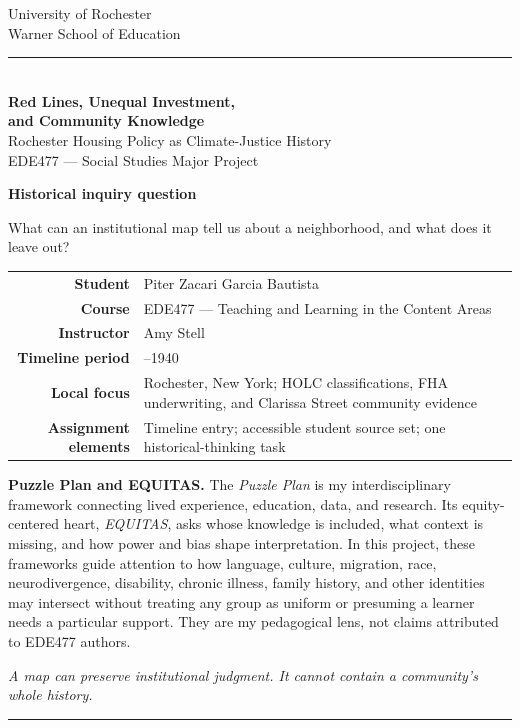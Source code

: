 \documentclass[11pt]{article}
\begin{document}
\hypersetup{pageanchor=false}
\begin{titlepage}
\thispagestyle{empty}
\begin{center}
{\large University of Rochester\\}
{\normalsize Warner School of Education\\[0.12in]}
{\color{PrimaryRed}\rule{\textwidth}{1.5pt}}\\[0.18in]
{\Huge\bfseries Red Lines, Unequal Investment,\\[0.06in]and Community Knowledge}\\[0.18in]
{\LARGE Rochester Housing Policy as Climate-Justice History}\\[0.18in]
{\Large EDE477 --- Social Studies Major Project}\\[0.12in]
\vfill
\begin{focusbox}
\centering
\textbf{Historical inquiry question}\par
What can an institutional map tell us about a neighborhood, and what does it leave out?
\end{focusbox}
\vfill
\renewcommand{\arraystretch}{1.28}
\begin{tabular}{>{\bfseries}r >{\RaggedRight\arraybackslash}p{5.15in}}
Student & Piter Zacari Garcia Bautista \\
Course & EDE477 --- Teaching and Learning in the Content Areas \\
Instructor & Amy Stell \\
Timeline period & 1935--1940 \\
Local focus & Rochester, New York; HOLC classifications, FHA underwriting, and Clarissa Street community evidence \\
Assignment elements & Timeline entry; accessible student source set; one historical-thinking task \\
\end{tabular}
\vspace{0.18in}
\begin{minipage}{0.99\textwidth}
\small
\textbf{Puzzle Plan and EQUITAS.} The \textit{Puzzle Plan} is my interdisciplinary framework connecting lived experience, education, data, and research. Its equity-centered heart, \textit{EQUITAS}, asks whose knowledge is included, what context is missing, and how power and bias shape interpretation. In this project, these frameworks guide attention to how language, culture, migration, race, neurodivergence, disability, chronic illness, family history, and other identities may intersect without treating any group as uniform or presuming a learner needs a particular support. They are my pedagogical lens, not claims attributed to EDE477 authors.
\end{minipage}
\vfill
{\itshape A map can preserve institutional judgment. It cannot contain a community's whole history.}\par
{\color{PrimaryRed}\rule{5.0in}{0.8pt}}
\end{center}
\restoregeometry
\end{titlepage}
\end{document}

